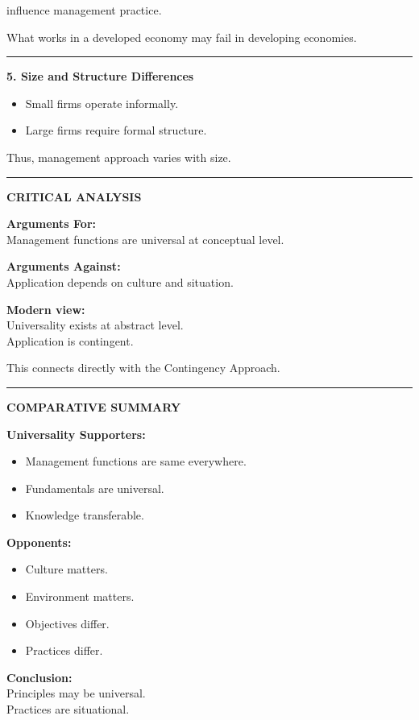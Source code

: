 \documentclass[10pt,a4paper]{article}
\newcommand{\separator}{\vspace{0.4em}\noindent\rule{\linewidth}{0.6pt}\vspace{0.4em}}
\begin{document}
influence management practice.

What works in a developed economy may fail in developing economies.

\separator

\textbf{5. Size and Structure Differences}

\begin{itemize}
  \item Small firms operate informally.
  \item Large firms require formal structure.
\end{itemize}

Thus, management approach varies with size.

\separator

\textbf{CRITICAL ANALYSIS}

\textbf{Arguments For:}\\
Management functions are universal at conceptual level.

\textbf{Arguments Against:}\\
Application depends on culture and situation.

\textbf{Modern view:}\\
Universality exists at abstract level.\\
Application is contingent.

This connects directly with the Contingency Approach.

\separator

\textbf{COMPARATIVE SUMMARY}

\textbf{Universality Supporters:}
\begin{itemize}
  \item Management functions are same everywhere.
  \item Fundamentals are universal.
  \item Knowledge transferable.
\end{itemize}

\textbf{Opponents:}
\begin{itemize}
  \item Culture matters.
  \item Environment matters.
  \item Objectives differ.
  \item Practices differ.
\end{itemize}

\textbf{Conclusion:}\\
Principles may be universal.\\
Practices are situational.
\end{document}
